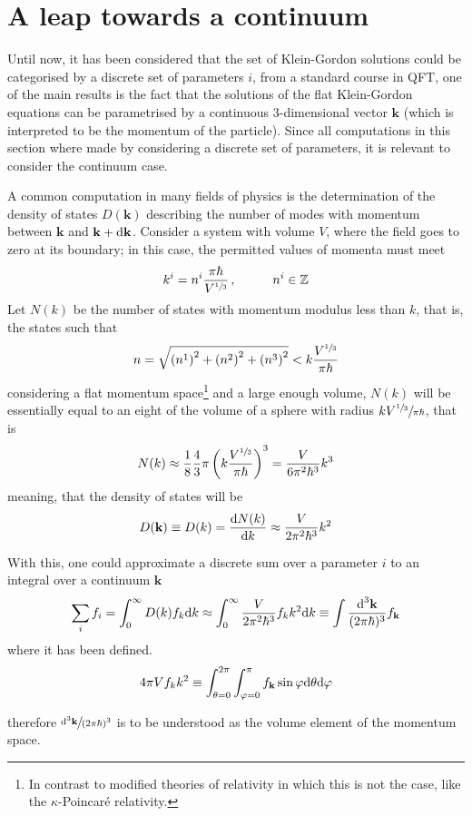 \section{A leap towards a continuum}
Until now, it has been considered that the set of Klein-Gordon solutions could be categorised by a discrete set of parameters $i$, from a standard course in QFT, one of the main results is the fact that the solutions of the flat Klein-Gordon equations can be parametrised by a continuous $3$-dimensional vector $\mathbf{k}$ (which is interpreted to be the momentum of the particle). Since all computations in this section where made by considering a discrete set of parameters, it is relevant to consider the continuum case.

A common computation in many fields of physics is the determination of the density of states $D(\mathbf{k})$ describing the number of modes with momentum between $\mathbf{k}$ and $\mathbf{k}+\text{d} \mathbf{k}$. Consider a system with volume $V$, where the field goes to zero at its boundary; in this case, the permitted values of momenta must meet
\begin{equation}
	k^i=n^i\frac{\pi\hbar}{V^{\sfrac{1}{3}}}\,,\hspace{1.0cm}n^i\in\mathbb{Z}
\end{equation}
Let $N(k)$ be the number of states with momentum modulus less than $k$, that is, the states such that
\begin{equation}
	n=\sqrt{\left(n^1\right)^2+\left(n^2\right)^2+\left(n^3\right)^2}<k\frac{V^{\sfrac{1}{3}}}{\pi\hbar}
\end{equation}
considering a flat momentum space\footnote{In contrast to modified theories of relativity in which this is not the case, like the $\kappa$-Poincaré relativity.} and a large enough volume, $N(k)$ will be essentially equal to an eight of the volume of a sphere with radius $kV^{\sfrac{1}{3}}\sfrac{}{\pi\hbar}$, that is
\begin{equation}
	N(k)\approx\frac{1}{8}\frac{4}{3}\pi\left(k\frac{V^{\sfrac{1}{3}}}{\pi\hbar}\right)^3=\frac{V}{6\pi^2\hbar^3}k^3
\end{equation} 
meaning, that the density of states will be
\begin{equation}
	D(\mathbf{k})\equiv D(k)=\frac{\text{d} N(k)}{\text{d} k}\approx\frac{V}{2\pi^2\hbar^3}k^2
\end{equation}

With this, one could approximate a discrete sum over a parameter $i$ to an integral over a continuum $\mathbf{k}$
\begin{equation}
	\sum_i f_i=\int_0^\infty D(k)f_k\text{d} k\approx\int_0^\infty\frac{V}{2\pi^2\hbar^3} f_k k^2\text{d} k\equiv\int\frac{\text{d}^3\mathbf{k}}{(2\pi\hbar)^3}f_\mathbf{k}
\end{equation}
where it has been defined.
\begin{equation}
	4\pi V f_k k^2\equiv \int_{\theta=0}^{2\pi}\int_{\varphi=0}^\pi f_\mathbf{k}\sin\varphi \text{d}\theta\text{d}\varphi
\end{equation}

therefore $\sfrac{\text{d}^3\mathbf{k}}{(2\pi\hbar)^3}$ is to be understood as the volume element of the momentum space.